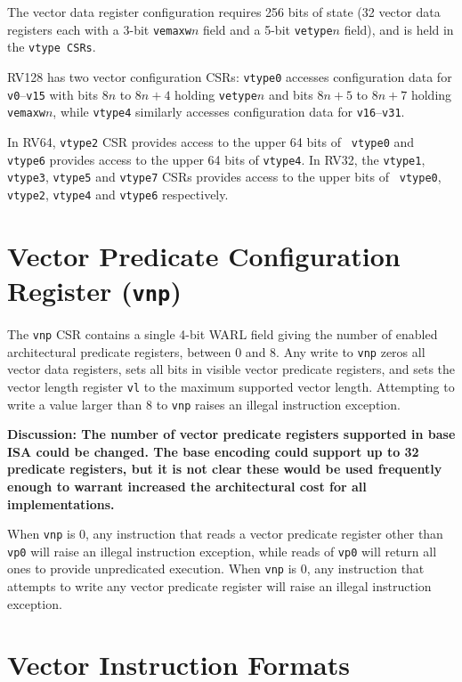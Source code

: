 The vector data register configuration requires 256 bits of state (32
vector data registers each with a 3-bit {\tt vemaxw}$n$ field and a
5-bit {\tt vetype}$n$ field), and is held in the {\tt vtype CSRs}.

RV128 has two vector configuration CSRs: {\tt vtype0} accesses
configuration data for {\tt v0}--{\tt v15} with bits $8n$ to $8n+4$
holding {\tt vetype}$n$ and bits $8n+5$ to $8n+7$ holding {\tt
  vemaxw}$n$, while {\tt vtype4} similarly accesses configuration data
for {\tt v16}--{\tt v31}.

In RV64, {\tt vtype2} CSR provides access to the upper 64 bits of {\tt
  vtype0} and {\tt vtype6} provides access to the upper 64 bits of
{\tt vtype4}.  In RV32, the {\tt vtype1}, {\tt vtype3}, {\tt vtype5}
and {\tt vtype7} CSRs provides access to the upper bits of {\tt
  vtype0}, {\tt vtype2}, {\tt vtype4} and {\tt vtype6} respectively.

\section{Vector Predicate Configuration Register ({\tt vnp})}

The {\tt vnp} CSR contains a single 4-bit WARL field giving the number
of enabled architectural predicate registers, between 0 and 8.  Any
write to {\tt vnp} zeros all vector data registers, sets all bits in
visible vector predicate registers, and sets the vector length
register {\tt vl} to the maximum supported vector length.  Attempting
to write a value larger than 8 to {\tt vnp} raises an illegal
instruction exception.

\begin{commentary}
{\bf Discussion: The number of vector predicate registers supported in
  base ISA could be changed.  The base encoding could support up to 32
  predicate registers, but it is not clear these would be used
  frequently enough to warrant increased the architectural cost for
  all implementations.}
\end{commentary}

When {\tt vnp} is 0, any instruction that reads a vector predicate
register other than {\tt vp0} will raise an illegal instruction
exception, while reads of {\tt vp0} will return all ones to provide
unpredicated execution.  When {\tt vnp} is 0, any instruction that
attempts to write any vector predicate register will raise an illegal
instruction exception.

\section{Vector Instruction Formats}

